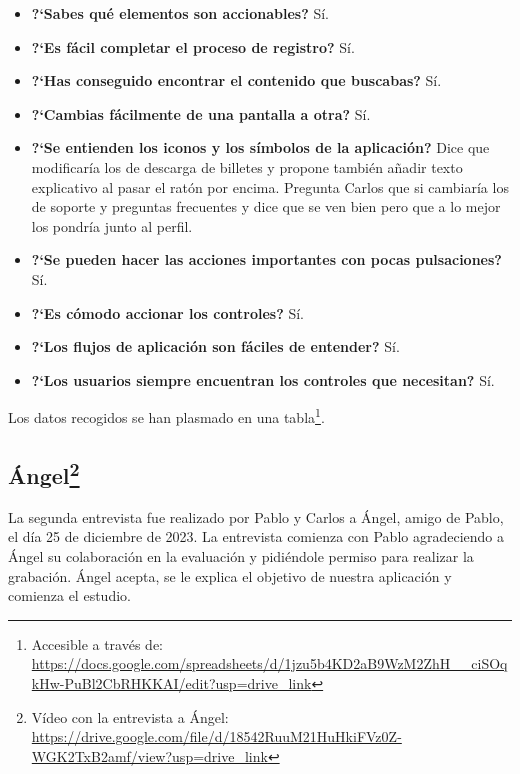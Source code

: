\begin{itemize}
    \item \textbf{?`Sabes qué elementos son accionables?} Sí. 
    \item \textbf{?`Es fácil completar el proceso de registro?} Sí. 
    \item \textbf{?`Has conseguido encontrar el contenido que buscabas?} Sí.
    \item \textbf{?`Cambias fácilmente de una pantalla a otra?} Sí.
    \item \textbf{?`Se entienden los iconos y los símbolos de la aplicación?} Dice que modificaría los de descarga de billetes y propone
        también añadir texto explicativo al pasar el ratón por encima. Pregunta Carlos que si cambiaría los de soporte y preguntas frecuentes
        y dice que se ven bien pero que a lo mejor los pondría junto al perfil.
    \item \textbf{?`Se pueden hacer las acciones importantes con pocas pulsaciones?} Sí.
    \item \textbf{?`Es cómodo accionar los controles?} Sí.
    \item \textbf{?`Los flujos de aplicación son fáciles de entender?} Sí.
    \item \textbf{?`Los usuarios siempre encuentran los controles que necesitan?} Sí.
\end{itemize}

Los datos recogidos se han plasmado en una tabla\footnote{Accesible a través de:
 \url{https://docs.google.com/spreadsheets/d/1jzu5b4KD2aB9WzM2ZhH__ciSOqkHw-PuBl2CbRHKKAI/edit?usp=drive_link}}.

\subsection[Ángel]{Ángel\footnote{Vídeo con la entrevista a Ángel: \url{https://drive.google.com/file/d/18542RuuM21HuHkiFVz0Z-WGK2TxB2amf/view?usp=drive_link}}}

La segunda entrevista fue realizado por Pablo y Carlos a Ángel, amigo de Pablo, el día 25 de diciembre de 2023. La entrevista
comienza con Pablo agradeciendo a Ángel su colaboración en la evaluación y pidiéndole permiso para realizar la grabación. Ángel
acepta, se le explica el objetivo de nuestra aplicación y comienza el estudio.

